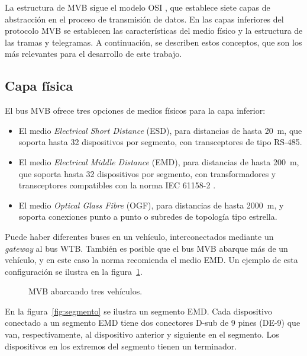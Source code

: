La estructura de MVB sigue el modelo OSI \cite{ISO7498-1}, que establece siete capas de abstracción en el proceso de transmisión de datos.
En las capas inferiores del protocolo MVB se establecen las características del medio físico y la estructura de las tramas y telegramas.
A continuación, se describen estos conceptos, que son los más relevantes para el desarrollo de este trabajo.

\subsection{Capa física}

El bus MVB ofrece tres opciones de medios físicos para la capa inferior:

\begin{itemize}
\item El medio \textit{Electrical Short Distance} (ESD), para distancias de hasta 20~m, que soporta hasta 32 dispositivos por segmento, con transceptores de tipo RS-485.
\item El medio \textit{Electrical Middle Distance} (EMD), para distancias de hasta 200~m, que soporta hasta  32 dispositivos por segmento, con transformadores y transceptores compatibles con la norma IEC 61158-2 \cite{iec61158_2}.
\item El medio \textit{Optical Glass Fibre} (OGF), para distancias de hasta 2000~m, y soporta conexiones punto a punto o subredes de topología tipo estrella.
\end{itemize}

Puede haber diferentes buses en un vehículo, interconectados mediante un \textit{gateway} al bus WTB.
También es posible que el bus MVB abarque más de un vehículo, y en este caso la norma recomienda el medio EMD.
Un ejemplo de esta configuración se ilustra en la figura~\ref{fig:emd-esd-wtb}.

\begin{figure}[htbp]
	\centering
    {
        \fontsize{9pt}{9pt}\selectfont
        
    }
	\caption[MVB abarcando tres vehículos]{MVB abarcando tres vehículos.}
    \label{fig:emd-esd-wtb}
\end{figure}

En la figura~\ref{fig:segmento} se ilustra un segmento EMD.
Cada dispositivo conectado a un segmento EMD tiene dos conectores D-sub de 9 pines (DE-9) que van, respectivamente, al dispositivo anterior y siguiente en el segmento. Los dispositivos en los extremos del segmento tienen un terminador.

